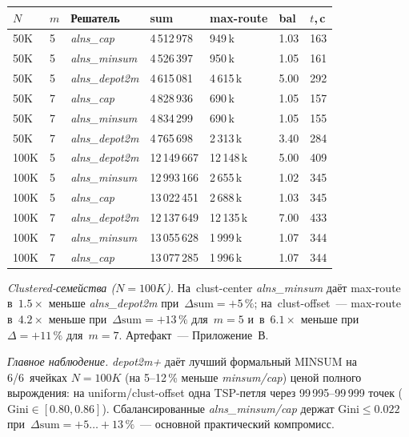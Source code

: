 \documentclass[a4paper,14pt]{extreport}
\begin{document}
\begin{center}\small
\setlength{\tabcolsep}{5pt}
\begin{tabular}{|C{1.0cm}|C{0.5cm}|L{2.6cm}|R{1.7cm}|R{1.5cm}|C{0.9cm}|C{1.0cm}|}
\hline
$N$ & $m$ & \textbf{Решатель} & \textbf{sum} & \textbf{max-route} & \textbf{bal} & \textbf{$t$,\,c} \\
\hline
50K  & 5 & \emph{alns\_cap}       & 4\,512\,978 & 949\,k    & 1.03 & 163 \\ \hline
50K  & 5 & \emph{alns\_minsum}    & 4\,526\,397 & 950\,k    & 1.05 & 161 \\ \hline
50K  & 5 & \emph{alns\_depot2m}   & 4\,615\,081 & 4\,615\,k & 5.00 & 292 \\ \hline
50K  & 7 & \emph{alns\_cap}       & 4\,828\,936 & 690\,k    & 1.05 & 157 \\ \hline
50K  & 7 & \emph{alns\_minsum}    & 4\,834\,299 & 690\,k    & 1.05 & 155 \\ \hline
50K  & 7 & \emph{alns\_depot2m}   & 4\,765\,698 & 2\,313\,k & 3.40 & 284 \\ \hline
\hline
100K & 5 & \emph{alns\_depot2m}   & 12\,149\,667 & 12\,148\,k & 5.00 & 409 \\ \hline
100K & 5 & \emph{alns\_minsum}    & 12\,993\,166 & 2\,655\,k  & 1.02 & 345 \\ \hline
100K & 5 & \emph{alns\_cap}       & 13\,022\,451 & 2\,688\,k  & 1.03 & 345 \\ \hline
100K & 7 & \emph{alns\_depot2m}   & 12\,137\,649 & 12\,135\,k & 7.00 & 433 \\ \hline
100K & 7 & \emph{alns\_minsum}    & 13\,055\,628 & 1\,999\,k  & 1.07 & 344 \\ \hline
100K & 7 & \emph{alns\_cap}       & 13\,077\,285 & 1\,996\,k  & 1.07 & 344 \\ \hline
\end{tabular}
\end{center}

\noindent\textit{Clustered-семейства ($N=100K$).} На~clust-center \emph{alns\_minsum} даёт max-route в~$1.5\times$ меньше \emph{alns\_depot2m} при~$\Delta\mathrm{sum}=+5\,\%$; на~clust-offset~--- max-route в~$4.2\times$ меньше при~$\Delta\mathrm{sum}=+13\,\%$ для~$m=5$ и~в~$6.1\times$ меньше при~$\Delta=+11\,\%$ для~$m=7$. Артефакт~--- Приложение~В.

\medskip
\textit{Главное наблюдение.} \emph{depot2m+} даёт лучший формальный MINSUM на 6/6~ячейках $N=100K$ (на 5--12\,\% меньше \emph{minsum/cap}) ценой полного вырождения: на uniform/clust-offset одна TSP-петля через 99\,995--99\,999 точек ($\mathrm{Gini}\in[0.80,0.86]$). Сбалансированные \emph{alns\_minsum/cap} держат $\mathrm{Gini}\leq 0.022$ при~$\Delta\mathrm{sum}=+5\dots+13\,\%$~--- основной практический компромисс.
\end{document}
